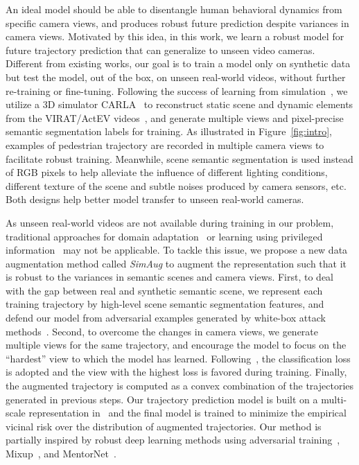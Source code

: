 \documentclass[runningheads]{eccv2020/llncs}
\begin{document}
An ideal model should be able to disentangle human behavioral dynamics from specific camera views, and produces robust future prediction despite variances in camera views. 
Motivated by this idea, in this work, we learn a robust model for future trajectory prediction that can generalize to unseen video cameras. Different from existing works, our goal is to train a model only on synthetic data but test the model, out of the box, on unseen real-world videos, without further re-training or fine-tuning. 
Following the success of learning from simulation~\cite{ruiz2018learning,de2017procedural,varol2019synthetic,zhang2019rsa,gaidon2016virtual,richter2016playing}, we utilize a 3D simulator CARLA~\cite{dosovitskiy2017carla} to reconstruct static scene and dynamic elements from the VIRAT/ActEV videos~\cite{oh2011large}, and generate multiple views and pixel-precise semantic segmentation labels for training. 
As illustrated in Figure~\ref{fig:intro},
examples of pedestrian trajectory are recorded in multiple camera views to facilitate robust training.
Meanwhile, scene semantic segmentation is used instead of RGB pixels to help alleviate the influence of different lighting conditions, different texture of the scene and subtle noises produced by camera sensors, etc.
Both designs help better model transfer to unseen real-world cameras.

As unseen real-world videos are not available during training in our problem, traditional approaches for domain adaptation~\cite{bousmalis2017unsupervised,ganin2016domain,tzeng2017adversarial} or learning using privileged information~\cite{lambert2018deep,vapnik2015learning,lopez2015unifying} may not be applicable.
To tackle this issue, we propose a new data augmentation method called \emph{SimAug} to augment the representation such that it is robust to the variances in semantic scenes and camera views. 
First, to deal with the gap between real and synthetic semantic scene, we represent each training trajectory by high-level scene semantic segmentation features, and defend our model from adversarial examples generated by white-box attack methods~\cite{goodfellow2014explaining}. 
Second, to overcome the changes in camera views, we generate multiple views for the same trajectory, and encourage the model to focus on the ``hardest'' view to which the model has learned. Following~\cite{jiang2017mentornet,lin2017focal}, the classification loss is adopted and the view with the highest loss is favored during training. 
Finally, the augmented trajectory is computed as a convex combination of the trajectories generated in previous steps. 
Our trajectory prediction model is built on a multi-scale representation in~\cite{liang2020garden} and the final model is trained to minimize the empirical vicinal risk over the distribution of augmented trajectories.
Our method is partially inspired by robust deep learning methods using adversarial training~\cite{madry2017towards,tramer2017ensemble,xie2019feature,cheng2019robust}, Mixup~\cite{zhang2017mixup}, and MentorNet~\cite{jiang2017mentornet}.
\end{document}
